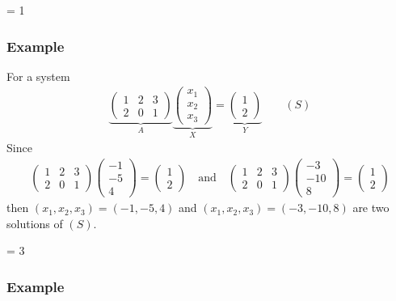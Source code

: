 \documentclass[usenames,dvipsnames,aspectratio=169,10pt]{beamer}
\def \EXAMPLEVERSION {1} %
\numberwithin{equation}{section}
\begin{document}
\ifnum \EXAMPLEVERSION = 1
\begin{frame}
\frametitle{Example}
For a system
\begin{align*}
\underbrace{
\begin{pmatrix}
1 & 2 & 3 \\
2 & 0 & 1
\end{pmatrix}}_A
\underbrace{
\begin{pmatrix}
x_{1} \\
x_{2} \\
x_{3}
\end{pmatrix}}_X
=
\underbrace{
\begin{pmatrix}
1 \\
2
\end{pmatrix}}_Y
\qquad (S)
\end{align*}
Since
\begin{align*}
\begin{pmatrix}
1 & 2 & 3 \\
2 & 0 & 1
\end{pmatrix}
\begin{pmatrix}
-1 \\
-5 \\
4
\end{pmatrix}
=
\begin{pmatrix}
1 \\
2
\end{pmatrix}
%
\quad\text{and}\quad
%
\begin{pmatrix}
1 & 2 & 3 \\
2 & 0 & 1
\end{pmatrix}
\begin{pmatrix}
-3 \\
-10 \\
8
\end{pmatrix}
=
\begin{pmatrix}
1 \\
2
\end{pmatrix}
\end{align*}
then $(x_1,x_2,x_3)=(-1,-5,4)$ and $(x_1,x_2,x_3)=(-3,-10,8)$ are two solutions of $(S)$.
\end{frame}
\fi 

\ifnum \EXAMPLEVERSION = 3
\begin{frame}
\frametitle{Example}
\end{frame}
\fi 
\end{document}
